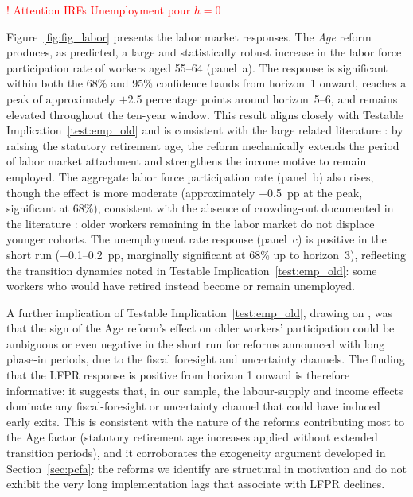 \documentclass[11pt,english,a4paper, twoside, authoryear]{article}
\begin{document}
\textcolor{red}{! Attention IRFs Unemployment pour $h=0$}

Figure~\ref{fig:fig_labor} presents the labor market responses. The \textit{Age} reform produces, as predicted, a large and statistically robust increase in the labor force participation rate of workers aged 55--64 (panel~a). The response is significant within both the 68\% and 95\% confidence bands from horizon~1 onward, reaches a peak of approximately $+$2.5 percentage points around horizon~5--6, and remains elevated throughout the ten-year window. This result aligns closely with Testable Implication~\ref{test:emp_old} and is consistent with the large related literature \citep{StaubliZweimuller2013,GruberWise1999}: by raising the statutory retirement age, the reform mechanically extends the period of labor market attachment and strengthens the income motive to remain employed. The aggregate labor force participation rate (panel~b) also rises, though the effect is more moderate (approximately $+$0.5~pp at the peak, significant at 68\%), consistent with the absence of crowding-out documented in the literature \citep{MunnellWu2012,Dai2022}: older workers remaining in the labor market do not displace younger cohorts. The unemployment rate response (panel~c) is positive in the short run ($+$0.1--0.2~pp, marginally significant at 68\% up to horizon~3), reflecting the transition dynamics noted in Testable Implication~\ref{test:emp_old}: some workers who would have retired instead become or remain unemployed. 

A further implication of Testable Implication~\ref{test:emp_old}, drawing on \citet{BiZubairy2023}, was that the sign of the Age reform's effect on older workers' participation could be ambiguous or even negative in the short run for reforms announced with long phase-in periods, due to the fiscal foresight and uncertainty channels. The finding that the LFPR response is positive from horizon 1 onward is therefore informative: it suggests that, in our sample, the labour-supply and income effects dominate any fiscal-foresight or uncertainty channel that could have induced early exits. This is consistent with the nature of the reforms contributing most to the Age factor (statutory retirement age increases applied without extended transition periods), and it corroborates the exogeneity argument developed in Section~\ref{sec:pcfa}: the reforms we identify are structural in motivation and do not exhibit the very long implementation lags that \citet{BiZubairy2023} associate with LFPR declines.
\end{document}
